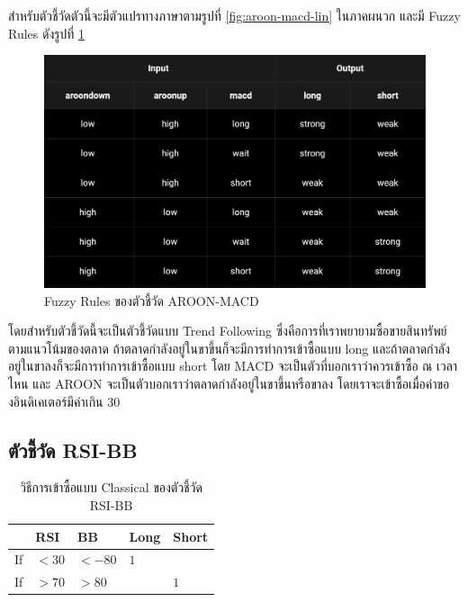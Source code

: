 สำหรับตัวชี้วัดตัวนี้จะมีตัวแปรทางภาษาตามรูปที่ \ref{fig:aroon-macd-lin} ในภาคผนวก และมี Fuzzy Rules ดังรูปที่ \ref{fig:aroon-macd-rules}
\begin{figure}[!ht]
    \centering
    \includegraphics[width=\textwidth]{images/aroon-macd-rules.png}
    \caption{Fuzzy Rules ของตัวชี้วัด AROON-MACD}
    \label{fig:aroon-macd-rules}
\end{figure}
โดยสำหรับตัวชี้วัดนี้จะเป็นตัวชี้วัดแบบ Trend Following ซึ่งคือการที่เราพยายามซื้อขายสินทรัพย์ตามแนวโน้มของตลาด ถ้าตลาดกำลังอยู่ในขาขึ้นก็จะมีการทำการเข้าซื้อแบบ long และถ้าตลาดกำลังอยู่ในขาลงก็จะมีการทำการเข้าซื้อแบบ short โดย MACD จะเป็นตัวที่บอกเราว่าควรเข้าซื้อ ณ เวลาไหน และ AROON จะเป็นตัวบอกเราว่าตลาดกำลังอยู่ในขาขึ้นหรือขาลง โดยเราจะเข้าซื้อเมื่อค่าของอินดิเคเตอร์มีค่าเกิน 30

\subsection{ตัวชี้วัด RSI-BB}
\begin{table}[ht]
    \centering
    \begin{tabular}{lllll}
        \hline
           & RSI   & BB     & Long & Short \\ \hline
        If & $<30$ & $<-80$ & $1$  &       \\ \hline
        If & $>70$ & $>80$  &      & $1$   \\ \hline
    \end{tabular}
    \caption{วิธีการเข้าซื้อแบบ Classical ของตัวชี้วัด RSI-BB}
\end{table}

